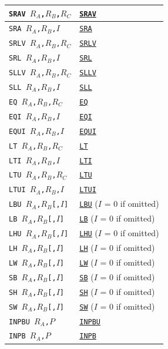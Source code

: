\documentclass[12pt,english,twoside]{report}
\def\code{\texttt}
\newcommand\machineinst[1]{\hyperref[sec:Ins_#1]{\code{#1}}}
\begin{document}
\begin{center}
\begin{longtable}{l|l}
      \hline
      \code{SRAV $R_A$,$R_B$,$R_C$} & \machineinst{SRAV}\\
      \hline
      \code{SRA $R_A$,$R_B$,$I$} & \machineinst{SRA}\\
      \hline
      \code{SRLV $R_A$,$R_B$,$R_C$} & \machineinst{SRLV}\\
      \hline
      \code{SRL $R_A$,$R_B$,$I$} & \machineinst{SRL}\\
      \hline
      \code{SLLV $R_A$,$R_B$,$R_C$} & \machineinst{SLLV}\\
      \hline
      \code{SLL $R_A$,$R_B$,$I$} & \machineinst{SLL}\\
      \hline
      \code{EQ $R_A$,$R_B$,$R_C$} & \machineinst{EQ}\\
      \hline
      \code{EQI $R_A$,$R_B$,$I$} & \machineinst{EQI}\\
      \hline
      \code{EQUI $R_A$,$R_B$,$I$} & \machineinst{EQUI}\\
      \hline
      \code{LT $R_A$,$R_B$,$R_C$} & \machineinst{LT}\\
      \hline
      \code{LTI $R_A$,$R_B$,$I$} & \machineinst{LTI}\\
      \hline
      \code{LTU $R_A$,$R_B$,$R_C$} & \machineinst{LTU}\\
      \hline
      \code{LTUI $R_A$,$R_B$,$I$} & \machineinst{LTUI}\\
      \hline
      \code{LBU $R_A$,$R_B$[,$I$]} & \machineinst{LBU} ($I$ = 0 if omitted)\\
      \hline
      \code{LB $R_A$,$R_B$[,$I$]} & \machineinst{LB} ($I$ = 0 if omitted)\\
      \hline
      \code{LHU $R_A$,$R_B$[,$I$]} & \machineinst{LHU} ($I$ = 0 if omitted)\\
      \hline
      \code{LH $R_A$,$R_B$[,$I$]} & \machineinst{LH} ($I$ = 0 if omitted)\\
      \hline
      \code{LW $R_A$,$R_B$[,$I$]} & \machineinst{LW} ($I$ = 0 if omitted)\\
      \hline
      \code{SB $R_A$,$R_B$[,$I$]} & \machineinst{SB} ($I$ = 0 if omitted)\\
      \hline
      \code{SH $R_A$,$R_B$[,$I$]} & \machineinst{SH} ($I$ = 0 if omitted)\\
      \hline
      \code{SW $R_A$,$R_B$[,$I$]} & \machineinst{SW} ($I$ = 0 if omitted)\\
      \hline
      \code{INPBU $R_A$,$P$} & \machineinst{INPBU}\\
      \hline
      \code{INPB $R_A$,$P$} & \machineinst{INPB}\\

\end{longtable}
\end{center}
\end{document}
